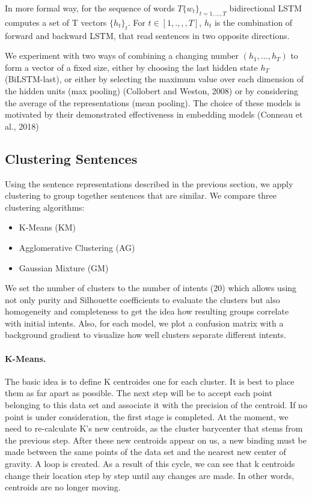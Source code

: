 \documentclass[11pt]{article}
\begin{document}
In more formal way, for the sequence of words $T \{w_{t}\}_{t = 1, ..., T}$ bidirectional LSTM computes a set of T vectors $\{h_{t}\}_{t}$. For $t ∈ [1 ,. ,,, T]$, $h_{t}$ is the combination of forward and backward LSTM, that read sentences in two opposite directions. 

We experiment with two ways of combining a changing number $(h_{1}, ..., h_{T})$ to form a vector of a fixed size, either by choosing the last hidden state $h_{T}$ (BiLSTM-last), or either by selecting the maximum value over each dimension of the hidden units (max pooling) (Collobert and Weston, 2008) or by considering the average of the representations (mean pooling). The choice of these models is motivated by their demonstrated effectiveness in embedding models (Conneau et al., 2018) 


\subsection{Clustering Sentences}

Using the sentence representations described in the previous section, we apply clustering to group together sentences that are similar. We compare three clustering algorithms:

\begin{itemize}
\item K-Means (KM)
\item Agglomerative Clustering (AG)
\item Gaussian Mixture (GM)
\end{itemize}

We set the number of clusters to the number of intents (20)
which allows using not only purity and Silhouette coefficients to
evaluate the clusters but also homogeneity and completeness to get the
idea how resulting groups correlate with initial intents. Also, for
each model, we plot a confusion matrix with a background gradient
to visualize how well clusters separate different intents.


\paragraph{K-Means.} The basic idea is to define K centroides one for each cluster. It is best to place them as far apart as possible. The next step will be to accept each point belonging to this data set and associate it with the precision of the centroid. If no point is under consideration, the first stage is completed. At the moment, we need to re-calculate K's new centroids, as the cluster barycenter that stems from the previous step. After these new centroids appear on us, a new binding must be made between the same points of the data set and the nearest new center of gravity. A loop is created. As a result of this cycle, we can see that k centroids change their location step by step until any changes are made. In other words, centroids are no longer moving.
\end{document}
